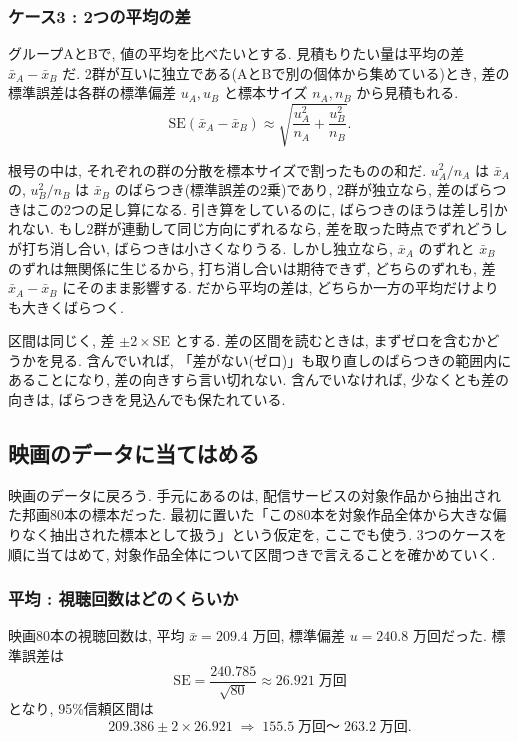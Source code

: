    \subsubsection*{ケース3 : 2つの平均の差}

    グループAとBで, 値の平均を比べたいとする.
    見積もりたい量は平均の差 $\bar{x}_A - \bar{x}_B$ だ.
    2群が互いに独立である(AとBで別の個体から集めている)とき, 差の標準誤差は各群の標準偏差 $u_A, u_B$ と標本サイズ $n_A, n_B$ から見積もれる.
    \[
      \mathrm{SE}(\bar{x}_A - \bar{x}_B) \approx \sqrt{\frac{u_A^2}{n_A} + \frac{u_B^2}{n_B}}.
    \]

    根号の中は, それぞれの群の分散を標本サイズで割ったものの和だ.
    $u_A^2/n_A$ は $\bar{x}_A$ の, $u_B^2/n_B$ は $\bar{x}_B$ のばらつき(標準誤差の2乗)であり, 2群が独立なら, 差のばらつきはこの2つの足し算になる.
    引き算をしているのに, ばらつきのほうは差し引かれない.
    もし2群が連動して同じ方向にずれるなら, 差を取った時点でずれどうしが打ち消し合い, ばらつきは小さくなりうる.
    しかし独立なら, $\bar{x}_A$ のずれと $\bar{x}_B$ のずれは無関係に生じるから, 打ち消し合いは期待できず, どちらのずれも, 差 $\bar{x}_A - \bar{x}_B$ にそのまま影響する.
    だから平均の差は, どちらか一方の平均だけよりも大きくばらつく.

    区間は同じく, 差 $\pm 2 \times \mathrm{SE}$ とする.
    差の区間を読むときは, まずゼロを含むかどうかを見る.
    含んでいれば, 「差がない(ゼロ)」も取り直しのばらつきの範囲内にあることになり, 差の向きすら言い切れない.
    含んでいなければ, 少なくとも差の向きは, ばらつきを見込んでも保たれている.

  \subsection{映画のデータに当てはめる}

    映画のデータに戻ろう.
    手元にあるのは, 配信サービスの対象作品から抽出された邦画80本の標本だった.
    最初に置いた「この80本を対象作品全体から大きな偏りなく抽出された標本として扱う」という仮定を, ここでも使う.
    3つのケースを順に当てはめて, 対象作品全体について区間つきで言えることを確かめていく.

    \subsubsection*{平均 : 視聴回数はどのくらいか}

    映画80本の視聴回数は, 平均 $\bar{x} = 209.4$ 万回, 標準偏差 $u = 240.8$ 万回だった.
    標準誤差は
    \[
      \mathrm{SE} = \frac{240.785}{\sqrt{80}} \approx 26.921\;\text{万回}
    \]
    となり, 95\%信頼区間は
    \[
      209.386 \pm 2 \times 26.921 \;\Rightarrow\; 155.5\;\text{万回〜}\;263.2\;\text{万回}.
    \]

